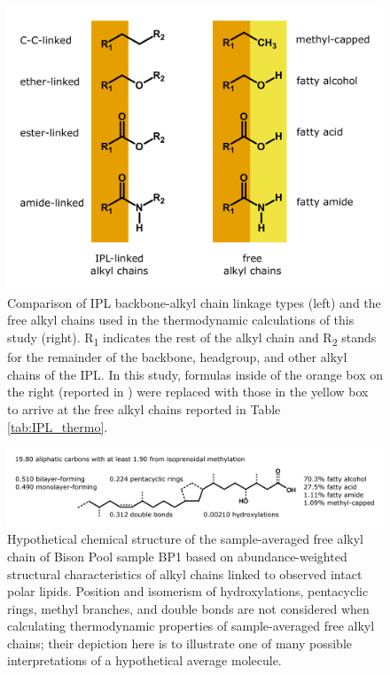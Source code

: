 \singlespace
\begin{figure}[h]
\centering
\includegraphics[width=\linewidth]{"figs_ch2/linked vs free alkyl chains"}
\caption[Comparison of IPL backbone-alkyl chain linkage types and the free alkyl chains used in thermodynamic calculations]{Comparison of IPL backbone-alkyl chain linkage types (left) and the free alkyl chains used in the thermodynamic calculations of this study (right). R\textsubscript{1} indicates the rest of the alkyl chain and R\textsubscript{2} stands for the remainder of the backbone, headgroup, and other alkyl chains of the IPL. In this study, formulas inside of the orange box on the right (reported in \cite{boyer2018thermophile}) were replaced with those in the yellow box to arrive at the free alkyl chains reported in Table \ref{tab:IPL_thermo}.}
\label{fig:linked_vs_free_chain}
\end{figure}
\doublespace

\singlespace
\begin{figure}[h]
\centering
\includegraphics[width=\linewidth]{figs_ch2/sample_average_chain_Bison1}
\caption[Hypothetical chemical structure of the sample-averaged free alkyl chain of Bison Pool sample BP1]{Hypothetical chemical structure of the sample-averaged free alkyl chain of Bison Pool sample BP1 based on abundance-weighted structural characteristics of alkyl chains linked to observed intact polar lipids. Position and isomerism of hydroxylations, pentacyclic rings, methyl branches, and double bonds are not considered when calculating thermodynamic properties of sample-averaged free alkyl chains; their depiction here is to illustrate one of many possible interpretations of a hypothetical average molecule.}
\label{fig:ave_chain}
\end{figure}
\doublespace


